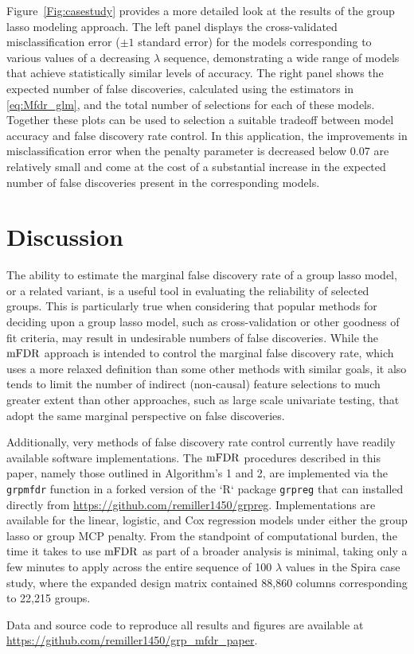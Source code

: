 Figure~\ref{Fig:casestudy} provides a more detailed look at the results of the group lasso modeling approach.  The left panel displays the cross-validated misclassification error ($\pm 1$ standard error) for the models corresponding to various values of a decreasing $\lambda$ sequence, demonstrating a wide range of models that achieve statistically similar levels of accuracy.  The right panel shows the expected number of false discoveries, calculated using the estimators in \ref{eq:Mfdr_glm}, and the total number of selections for each of these models.  Together these plots can be used to selection a suitable tradeoff between model accuracy and false discovery rate control.  In this application, the improvements in misclassification error when the penalty parameter is decreased below 0.07 are relatively small and come at the cost of a substantial increase in the expected number of false discoveries present in the corresponding models.

\section{Discussion}

The ability to estimate the marginal false discovery rate of a group lasso model, or a related variant, is a useful tool in evaluating the reliability of selected groups.  This is particularly true when considering that popular methods for deciding upon a group lasso model, such as cross-validation or other goodness of fit criteria, may result in undesirable numbers of false discoveries. While the $\textrm{mFDR}$ approach is intended to control the marginal false discovery rate, which uses a more relaxed definition than some other methods with similar goals, it also tends to limit the number of indirect (non-causal) feature selections to much greater extent than other approaches, such as large scale univariate testing, that adopt the same marginal perspective on false discoveries.

Additionally, very methods of false discovery rate control currently have readily available software implementations.  The $\textrm{mFDR}$ procedures described in this paper, namely those outlined in Algorithm's 1 and 2, are implemented via the {\tt grpmfdr} function in a forked version of the `R` package {\tt grpreg} \citep{Breheny2009} that can installed directly from \url{https://github.com/remiller1450/grpreg}.  Implementations are available for the linear, logistic, and Cox regression models under either the group lasso or group MCP penalty.  From the standpoint of computational burden, the time it takes to use $\textrm{mFDR}$ as part of a broader analysis is minimal, taking only a few minutes to apply across the entire sequence of 100 $\lambda$ values in the Spira case study, where the expanded design matrix contained 88,860 columns corresponding to 22,215 groups.

\bigskip


\noindent Data and source code to reproduce all results and figures are available at \url{https://github.com/remiller1450/grp_mfdr_paper}.